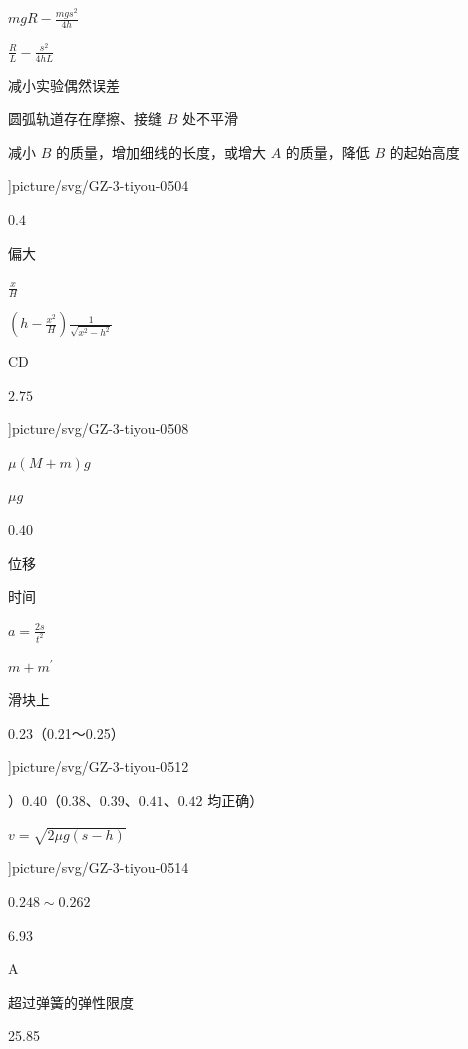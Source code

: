 \item $m g R-\frac {m g s^{2}}{4 h}$
\item $\frac {R}{L}-\frac {s^{2}}{4 h L}$
\item 减小实验偶然误差
\item 圆弧轨道存在摩擦、接缝 $ B $ 处不平滑
\item 减小 $ B $ 的质量，增加细线的长度，或增大 $ A $ 的质量，降低 $ B $ 的起始高度
\item \linewidth ]{picture/svg/GZ-3-tiyou-0504}
\item $ 0.4 $
\item 偏大
\item \par 
\item $ \frac {x}{H} $
\item $\left (h-\frac {x^{2}}{H}\right ) \frac {1}{\sqrt {x^{2}-h^{2}}}$
\item CD
\item $ 2.75 $
\item \linewidth ]{picture/svg/GZ-3-tiyou-0508}
\item $ \mu (M+m)g $
\item $ \mu g $
\item $ 0.40 $
\item 位移
\item 时间
\item $a=\frac {2 s}{t^{2}}$
\item $m+m^{\prime }$
\item 滑块上
\item 0.23（0.21～0.25）
\item \linewidth ]{picture/svg/GZ-3-tiyou-0512}
\item ）$ 0.40 $（$ 0.38 $、$ 0.39 $、$ 0.41 $、$ 0.42 $ 均正确）
\item $v=\sqrt {2 \mu g(s-h)}$
\item \par 
\item \linewidth ]{picture/svg/GZ-3-tiyou-0514}
\item $ 0.248\sim 0.262 $
\item \par 
\item 6.93
\item A
\item 超过弹簧的弹性限度
\item \par 
\item 25.85
